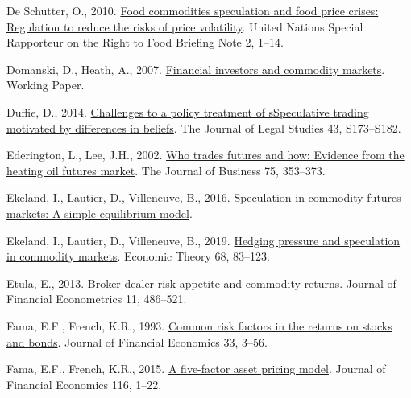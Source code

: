 \documentclass[]{elsarticle} %
\newlength{\cslhangindent}
\newlength{\cslentryspacingunit} %
\newenvironment{CSLReferences}[2] %
 {%
  \setlength{\parindent}{0pt}
  \ifodd #1
  \let\oldpar\par
  \def\par{\hangindent=\cslhangindent\oldpar}
  \fi
  \setlength{\parskip}{#2\cslentryspacingunit}
 }%
 {}
\begin{document}
\begin{CSLReferences}{1}{0}
\leavevmode{}%
De Schutter, O., 2010. \href{https://www2.ohchr.org/english/issues/food/docs/briefing_note_02_september_2010_en.pdf}{Food commodities speculation and food price crises: Regulation to reduce the risks of price volatility}. United Nations Special Rapporteur on the Right to Food Briefing Note 2, 1--14.

\leavevmode{}%
Domanski, D., Heath, A., 2007. \href{https://www.bis.org/publ/qtrpdf/r_qt0703g.pdf}{Financial investors and commodity markets}. Working Paper.

\leavevmode{}%
Duffie, D., 2014. \href{https://doi.org/10.1086/677836}{Challenges to a policy treatment of sSpeculative trading motivated by differences in beliefs}. The Journal of Legal Studies 43, S173--S182.

\leavevmode{}%
Ederington, L., Lee, J.H., 2002. \href{https://doi.org/10.1086/338706}{Who trades futures and how: Evidence from the heating oil futures market}. The Journal of Business 75, 353--373.

\leavevmode{}%
Ekeland, I., Lautier, D., Villeneuve, B., 2016. \href{https://hal.archives-ouvertes.fr/hal-01655848}{Speculation in commodity futures markets: A simple equilibrium model}.

\leavevmode{}%
Ekeland, I., Lautier, D., Villeneuve, B., 2019. \href{https://doi.org/10.1007/s00199-018-1115-y}{Hedging pressure and speculation in commodity markets}. Economic Theory 68, 83--123.

\leavevmode{}%
Etula, E., 2013. \href{https://doi.org/10.1093/jjfinec/nbs024}{Broker-dealer risk appetite and commodity returns}. Journal of Financial Econometrics 11, 486--521.

\leavevmode{}%
Fama, E.F., French, K.R., 1993. \href{https://doi.org/10.1016/0304-405X(93)90023-5}{Common risk factors in the returns on stocks and bonds}. Journal of Financial Economics 33, 3--56.

\leavevmode{}%
Fama, E.F., French, K.R., 2015. \href{https://doi.org/10.1016/j.jfineco.2014.10.010}{A five-factor asset pricing model}. Journal of Financial Economics 116, 1--22.


\end{CSLReferences}
\end{document}
